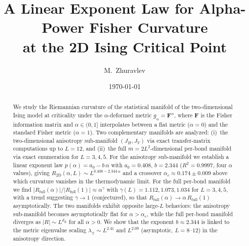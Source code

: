 \documentclass[twocolumn,showpacs,preprintnumbers,amsmath,amssymb,prl]{revtex4-2}
\newcommand{\Fmat}{\mathbf{F}}
\newcommand{\RtwoD}{R_{\mathrm{2D}}}
\newcommand{\Rfull}{R_{\mathrm{full}}}
\newcommand{\alphac}{\alpha_c}
\begin{document}
\preprint{}

\title{A Linear Exponent Law for Alpha-Power Fisher Curvature\\
       at the 2D Ising Critical Point}

\author{M.~Zhuravlev}

\date{\today}

\begin{abstract}
We study the Riemannian curvature of the statistical manifold of the
two-dimensional Ising model at criticality under the $\alpha$-deformed
metric $g_\alpha = \Fmat^\alpha$, where $\Fmat$ is the Fisher information
matrix and $\alpha \in (0,1]$ interpolates between a flat metric ($\alpha=0$)
and the standard Fisher metric ($\alpha=1$).
Two complementary manifolds are analyzed: (i)~the two-dimensional anisotropy
sub-manifold $(J_H, J_V)$ via exact transfer-matrix computations up to $L=12$,
and (ii)~the full $m=2L^2$-dimensional per-bond manifold via exact enumeration
for $L=3,4,5$.
For the anisotropy sub-manifold we establish a linear exponent law
$p(\alpha) = a_0 - b\,\alpha$ with $a_0 = 0.408$, $b = 2.344$ ($R^2 = 0.9997$,
four $\alpha$ values),
giving $\RtwoD(\alpha, L) \sim L^{0.408 - 2.344\,\alpha}$
and a crossover $\alphac \approx 0.174 \pm 0.009$ above which curvature vanishes
in the thermodynamic limit.
For the full per-bond manifold we find $|\Rfull(\alpha)|/|\Rfull(1)| \approx \alpha^\gamma$
with $\gamma(L) = 1.112, 1.073, 1.034$ for $L=3,4,5$, with a trend
suggesting $\gamma \to 1$ (conjectured), so that $\Rfull(\alpha) \to \alpha\,\Rfull(1)$
asymptotically.
The two manifolds exhibit opposite large-$L$ behaviors:
the anisotropy sub-manifold becomes asymptotically flat for $\alpha > \alphac$,
while the full per-bond manifold diverges as $|R| \sim L^{d_R}$ for all
$\alpha > 0$.
We show that the exponent $b \approx 2.344$ is linked to the metric eigenvalue
scaling $\lambda_\pm \sim L^{2.41}$ and $L^{2.09}$ (asymptotic, $L=8$--$12$)
in the anisotropy direction.
\end{abstract}


\maketitle

\end{document}
